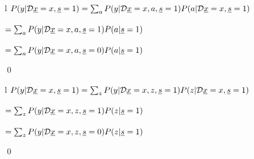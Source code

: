 \begin{claim}
\label{cl-decTransportBox}
\decTransportBox
\end{claim}
\proof
\begin{longtable}{l}
\color{red}$
P(y|{\cal D}{\underline{x}}=x, {\underline{s}}=1)
=
\sum_{a}
P(y|{\cal D}{\underline{x}}=x, a, {\underline{s}}=1)P(a|{\cal D}{\underline{x}}=x, {\underline{s}}=1)$
\\
\xymatrix{\\=}
\\
\color{red}$
=\sum_{a}
P(y|{\cal D}{\underline{x}}=x,a,  {\underline{s}}=1)P(a|{\underline{s}}=1)$
\\
\xymatrix{\\=}
\\
\color{red}$
=\sum_{a}
P(y|{\cal D}{\underline{x}}=x,a, {\underline{s}}=0)P(a|{\underline{s}}=1)$
\\
\xymatrix{\\=}
\end{longtable}
\qed

\begin{claim}
\label{cl-decTransportOne}
 \decTransportOne
\end{claim}
\proof
\begin{longtable}{l}
\color{red}
$P(y|{\cal D} {\underline{x}}=x, {\underline{s}}=1)=
\sum_ zP(y|{\cal D}{\underline{x}}=x,z,
{\underline{s}}=1)P(z|{\cal D}{\underline{x}}=x,{\underline{s}}=1)$
\\
\xymatrix{\\=}
\\
\color{red}
$=\sum_ zP(y|{\cal D}{\underline{x}}=x,z,
{\underline{s}}=1)P(z|{\underline{s}}=1)$
\\
\xymatrix{\\=}
\\
\color{red}
$=\sum_ zP(y|{\cal D}{\underline{x}}=x,z,
{\underline{s}}=0)P(z|{\underline{s}}=1)$
\\
\xymatrix{\\=}
\end{longtable}
\qed

